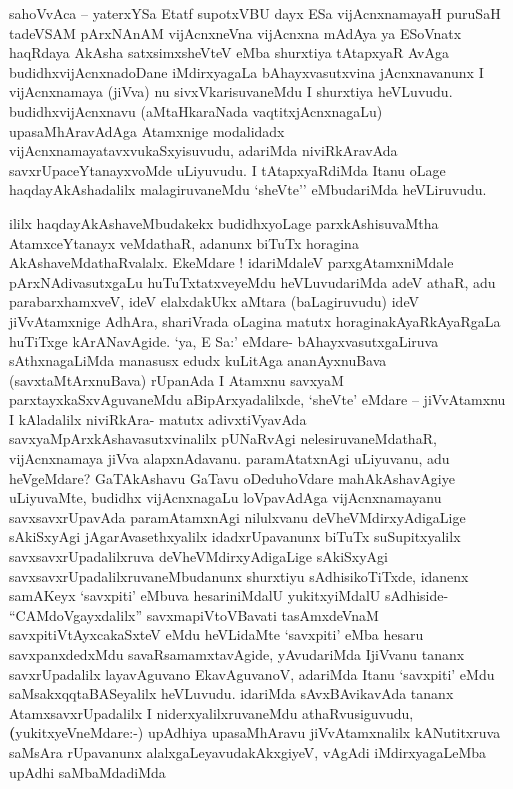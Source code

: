\begin{artha}
sahoVvAca \mdash -- yaterxYSa Etatf supotxV\s BU dayx ESa vijAcnxnamayaH
puruSaH tadeVSAM pArxNAnAM vijAcnxneVna vijAcnxna mAdAya ya ESoV\s natx
haqRdaya AkAsha satxsimxsheVteV eMba shurxtiya tAtapxyaR  \mdash  \mdash AvAga
budidhxvijAcnxnadoDane iMdirxyagaLa bAhayxvasutxvina jAcnxnavanunx I
vijAcnxnamaya (jiVva) nu sivxVkarisuvaneMdu I shurxtiya
heVLuvudu. budidhxvijAcnxnavu (aMtaHkaraNada vaqtitxjAcnxnagaLu)
upasaMhAravAdAga Atamxnige modalidadx
vijAcnxnamayatavxvukaSxyisuvudu, adariMda niviRkAravAda
savxrUpaceYtanayxvoMde uLiyuvudu. I tAtapxyaRdiMda Itanu oLage
haqdayAkAshadalilx malagiruvaneMdu `sheVte'' eMbudariMda heVLiruvudu.
\end{artha}

\begin{artha}
ililx haqdayAkAshaveMbudakekx budidhxyoLage parxkAshisuvaMtha
AtamxceYtanayx veMdathaR, adanunx biTuTx horagina
AkAshaveMdathaRvalalx. EkeMdare ! idariMdaleV parxgAtamxniMdale
pArxNAdivasutxgaLu huTuTxtatxveyeMdu heVLuvudariMda adeV athaR, adu
parabarxhamxveV, ideV elalxdakUkx aMtara (baLagiruvudu) ideV
jiVvAtamxnige AdhAra, shariVrada oLagina matutx horaginakAyaRkAyaRgaLa
huTiTxge kArANavAgide. `ya, E Sa:' eMdare- bAhayxvasutxgaLiruva
sAthxnagaLiMda manasusx edudx kuLitAga ananAyxnuBava
(savxtaMtArxnuBava) rUpanAda I Atamxnu savxyaM parxtayxkaSxvAguvaneMdu
aBipArxyadalilxde, `sheVte' eMdare -- jiVvAtamxnu I kAladalilx
niviRkAra- matutx adivxtiVyavAda savxyaMpArxkAshavasutxvinalilx
pUNaRvAgi nelesiruvaneMdathaR, vijAcnxnamaya jiVva
alapxnAdavanu. paramAtatxnAgi uLiyuvanu, adu heVgeMdare? GaTAkAshavu
GaTavu oDeduhoVdare mahAkAshavAgiye uLiyuvaMte, budidhx vijAcnxnagaLu
loVpavAdAga vijAcnxnamayanu savxsavxrUpavAda paramAtamxnAgi nilulxvanu
deVheVMdirxyAdigaLige sAkiSxyAgi jAgarAvasethxyalilx idadxrUpavanunx
biTuTx suSupitxyalilx savxsavxrUpadalilxruva deVheVMdirxyAdigaLige
sAkiSxyAgi savxsavxrUpadalilxruvaneMbudanunx shurxtiyu sAdhisikoTiTxde, idanenx
samAKeyx `savxpiti' eMbuva hesariniMdalU yukitxyiMdalU sAdhiside-
``CAMdoVgayxdalilx'' savxmapiVtoVBavati  tasAmxdeVnaM
savxpitiVtAyxcakaSxteV eMdu heVLidaMte `savxpiti' eMba hesaru
savxpanxdedxMdu savaRsamamxtavAgide, yAvudariMda IjiVvanu tananx
savxrUpadalilx layavAguvano EkavAguvanoV, adariMda Itanu `savxpiti'
eMdu saMsakxqqtaBASeyalilx heVLuvudu. idariMda sAvxBAvikavAda tananx
AtamxsavxrUpadalilx I niderxyalilxruvaneMdu
athaRvusiguvudu, \textbf(yukitxyeVneMdare:-) upAdhiya upasaMhAravu
jiVvAtamxnalilx kANutitxruva saMsAra rUpavanunx
alalxgaLeyavudakAkxgiyeV, vAgAdi iMdirxyagaLeMba upAdhi saMbaMdadiMda

\end{artha}
